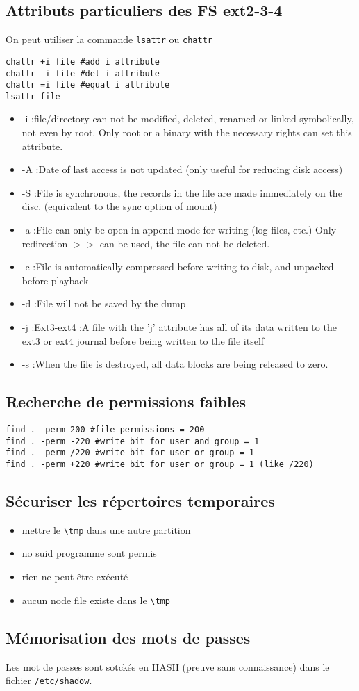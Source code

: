 \subsection{Attributs particuliers des FS ext2-3-4}
On peut utiliser la commande \verb!lsattr! ou \verb!chattr!
\begin{lstlisting}[style=bash,label={lst:attribus},caption={}]
chattr +i file #add i attribute
chattr -i file #del i attribute
chattr =i file #equal i attribute
lsattr file
\end{lstlisting}
\begin{itemize}
\item -i :file/directory can not be modified, deleted, renamed or linked symbolically, not even by root. Only root or a binary with the necessary rights can set this attribute.
\item -A :Date of last access is not updated (only useful for reducing disk
access)
\item -S :File is synchronous, the records in the file are made immediately on the disc. (equivalent to the sync option of mount)
\item -a :File can only be open in append mode for writing (log files, etc.) Only redirection $>>$ can be used, the file can not be deleted.
\item -c :File is automatically compressed before writing to disk, and unpacked before playback
\item -d :File will not be saved by the dump
\item -j :Ext3-ext4 :A file with the 'j' attribute has all of its data written to
the ext3 or ext4 journal before being written to the file itself
\item -s :When the file is destroyed, all data blocks are being released to zero.
\end{itemize}

\subsection{Recherche de permissions faibles}
\begin{lstlisting}[style=bash,label={lst:perm},caption={}]
find . -perm 200 #file permissions = 200
find . -perm -220 #write bit for user and group = 1
find . -perm /220 #write bit for user or group = 1
find . -perm +220 #write bit for user or group = 1 (like /220)
\end{lstlisting}

\subsection{Sécuriser les répertoires temporaires}
\begin{itemize}
\item mettre le \verb!\tmp! dans une autre partition
\item no suid programme sont permis
\item rien ne peut être exécuté 
\item aucun node file existe dans le \verb!\tmp!
\end{itemize}

\subsection{Mémorisation des mots de passes}
Les mot de passes sont sotckés en HASH (preuve sans connaissance) dans le fichier \verb+/etc/shadow+.